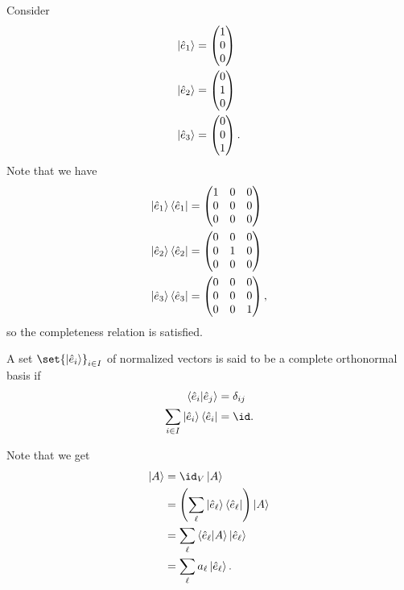 \documentclass[10pt]{mypackage}
\begin{document}
\begin{example}
  Consider
  \begin{align*}
    \ket{\hat{e}_1} &= \begin{pmatrix}1\\0\\0\end{pmatrix}\\
    \ket{\hat{e}_2} &= \begin{pmatrix}0\\1\\0\end{pmatrix}\\
    \ket{\hat{e}_3} &= \begin{pmatrix}0\\0\\1\end{pmatrix}.
  \end{align*}
  Note that we have
  \begin{align*}
    \ket{\hat{e}_1}\bra{\hat{e}_1} &= \begin{pmatrix}1 & 0 & 0 \\ 0 & 0 & 0 \\ 0 & 0 & 0\end{pmatrix}\\
    \ket{\hat{e}_2}\bra{\hat{e}_2} &= \begin{pmatrix}0 & 0 & 0 \\ 0 & 1 & 0 \\ 0 & 0 & 0\end{pmatrix}\\
    \ket{\hat{e}_3}\bra{\hat{e}_3} &= \begin{pmatrix}0 & 0 & 0 \\ 0 & 0 & 0 \\ 0 & 0 & 1\end{pmatrix},
  \end{align*}
  so the completeness relation is satisfied.
\end{example}
\begin{definition}
  A set $\set{\ket{\hat{e}_{i}}}_{i\in I}$ of normalized vectors is said to be a complete orthonormal basis if
  \begin{align*}
    \braket{\hat{e}_i}{\hat{e}_j} &= \delta_{ij}\\
    \sum_{i\in I}\ket{\hat{e}_i}\bra{\hat{e}_i} &= \id.
  \end{align*}
\end{definition}
Note that we get
\begin{align*}
  \ket{A} &= \id_{V}\ket{A}\\
          &= \left(\sum_{\ell} \ket{\hat{e}_{\ell}}\bra{\hat{e}_{\ell}}\right)\ket{A}\\
          &= \sum_{\ell}\braket{\hat{e}_{\ell}}{A}\ket{\hat{e}_{\ell}}\\
          &= \sum_{\ell}a_{\ell}\ket{\hat{e}_{\ell}}.
\end{align*}
\end{document}
